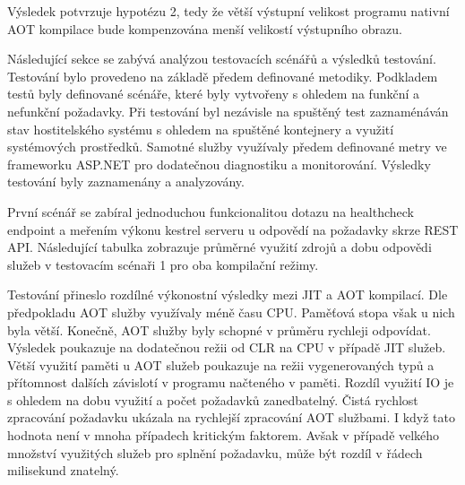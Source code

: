Výsledek potvrzuje hypotézu 2, tedy že větší výstupní velikost programu nativní AOT kompilace bude kompenzována menší velikostí výstupního obrazu.


Následující sekce se zabývá analýzou testovacích scénářů a výsledků testování. Testování bylo provedeno na základě předem definované metodiky. Podkladem testů byly definované scénáře, které byly vytvořeny s ohledem na funkční a nefunkční požadavky. Při testování byl nezávisle na spuštěný test zaznaménáván stav hostitelského systému s ohledem na spuštěné kontejnery a využití systémových prostředků. Samotné služby využívaly předem definované metry ve frameworku ASP.NET pro dodatečnou diagnostiku a monitorování. Výsledky testování byly zaznamenány a analyzovány.


První scénář se zabíral jednoduchou funkcionalitou dotazu na healthcheck endpoint a meřením výkonu kestrel serveru u odpovědí na požadavky skrze REST API. Následující tabulka zobrazuje průměrné využití zdrojů a dobu odpovědi služeb v testovacím scénaři 1 pro oba kompilační režimy.


Testování přineslo rozdílné výkonostní výsledky mezi JIT a AOT kompilací. Dle předpokladu AOT služby využívaly méně času CPU. Paměťová stopa však u nich byla větší. Konečně, AOT služby byly schopné v průměru rychleji odpovídat. Výsledek poukazuje na dodatečnou režii od CLR na CPU v případě JIT služeb. Větší využití paměti u AOT služeb poukazuje na režii vygenerovaných typů a přítomnost dalších závislotí v programu načteného v paměti. Rozdíl využití IO je s ohledem na dobu využití a počet požadavků zanedbatelný. Čistá rychlost zpracování požadavku ukázala na rychlejší zpracování AOT službami. I když tato hodnota není v mnoha případech kritickým faktorem. Avšak v případě velkého množství využitých služeb pro splnění požadavku, může být rozdíl v řádech milisekund znatelný.

